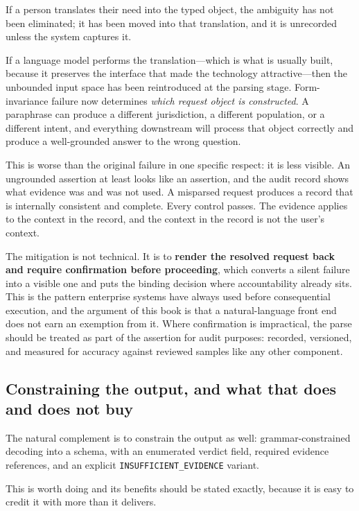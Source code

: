 If a person translates their need into the typed object, the ambiguity has not been
eliminated; it has been moved into that translation, and it is unrecorded unless the
system captures it.

If a language model performs the translation---which is what is usually built,
because it preserves the interface that made the technology attractive---then the
unbounded input space has been reintroduced at the parsing stage. Form-invariance
failure now determines \emph{which request object is constructed}. A paraphrase can
produce a different jurisdiction, a different population, or a different intent, and
everything downstream will process that object correctly and produce a well-grounded
answer to the wrong question.

This is worse than the original failure in one specific respect: it is less visible.
An ungrounded assertion at least looks like an assertion, and the audit record shows
what evidence was and was not used. A misparsed request produces a record that is
internally consistent and complete. Every control passes. The evidence applies to the
context in the record, and the context in the record is not the user's context.

The mitigation is not technical. It is to \textbf{render the resolved request back and
require confirmation before proceeding}, which converts a silent failure into a
visible one and puts the binding decision where accountability already sits. This is
the pattern enterprise systems have always used before consequential execution, and
the argument of this book is that a natural-language front end does not earn an
exemption from it. Where confirmation is impractical, the parse should be treated as
part of the assertion for audit purposes: recorded, versioned, and measured for
accuracy against reviewed samples like any other component.

\subsection{Constraining the output, and what that does and does not buy}
\label{sec:constrained-output}

The natural complement is to constrain the output as well: grammar-constrained
decoding into a schema, with an enumerated verdict field, required evidence
references, and an explicit \texttt{INSUFFICIENT\_EVIDENCE} variant.

This is worth doing and its benefits should be stated exactly, because it is easy to
credit it with more than it delivers.

